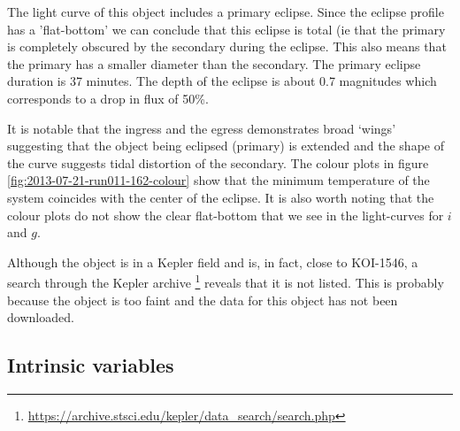The light curve of this object includes a primary eclipse. Since the eclipse profile has a 'flat-bottom' we can conclude that this eclipse is total (ie that the primary is completely obscured by the secondary during the eclipse. This also means that the primary has a smaller diameter than the secondary. The primary eclipse duration is 37 minutes. The depth of the eclipse is about 0.7 magnitudes which corresponds to a drop in flux of 50\%. 

It is notable that the ingress and the egress demonstrates broad `wings' suggesting that the object being eclipsed (primary) is extended and the shape of the curve suggests tidal distortion of the secondary. The colour plots in figure \ref{fig:2013-07-21-run011-162-colour} show that the minimum temperature of the system coincides with the center of the eclipse. It is also worth noting that the colour plots do not show the clear flat-bottom that we see in the light-curves for $i$ and $g$. 

Although the object is in a Kepler field and is, in fact, close to KOI-1546, a search through the Kepler archive \footnote{\url{https://archive.stsci.edu/kepler/data_search/search.php}} reveals that it is not listed. This is probably because the object is too faint and the data for this object has not been downloaded. 

\newpage
\subsection{Intrinsic variables}

